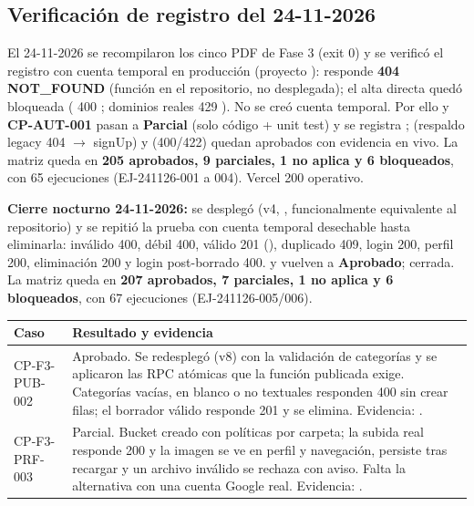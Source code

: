 \documentclass[11pt,a4paper]{article}
\begin{document}
\subsection*{Verificación de registro del 24-11-2026}

El 24-11-2026 se recompilaron los cinco PDF de Fase 3 (exit 0) y se verificó el registro
con cuenta temporal en producción (proyecto ):
 responde \textbf{404 NOT\_FOUND}
(función en el repositorio, no desplegada); el alta directa quedó bloqueada
( 400 ; dominios reales 429
). No se creó cuenta temporal. Por ello
 y \textbf{CP-AUT-001} pasan a \textbf{Parcial} (solo código +
unit test) y se registra ;  (respaldo legacy
404 $\rightarrow$ signUp) y  (400/422) quedan aprobados con evidencia
en vivo. La matriz queda en \textbf{205 aprobados, 9 parciales, 1 no aplica y 6 bloqueados},
con 65 ejecuciones (EJ-241126-001 a 004). Vercel  200 operativo.

\textbf{Cierre nocturno 24-11-2026:} se desplegó  (v4,
, funcionalmente equivalente al repositorio) y se repitió la
prueba con cuenta temporal desechable hasta eliminarla: inválido 400, débil 400,
válido 201 (), duplicado 409, login 200, perfil 200, eliminación
200 y login post-borrado 400.  y  vuelven a
\textbf{Aprobado};  cerrada. La matriz queda en \textbf{207 aprobados,
7 parciales, 1 no aplica y 6 bloqueados}, con 67 ejecuciones (EJ-241126-005/006).

\begin{longtable}{@{}L{2.4cm}L{12.4cm}@{}}
\toprule
\textbf{Caso} & \textbf{Resultado y evidencia} \\
\midrule
\endhead
CP-F3-PUB-002 & Aprobado. Se redesplegó  (v8) con la validación de
categorías y se aplicaron las RPC atómicas que la función publicada exige. Categorías
vacías, en blanco o no textuales responden 400 sin crear filas; el borrador válido responde
201 y se elimina. Evidencia: . \\
CP-F3-PRF-003 & Parcial. Bucket  creado con políticas por carpeta; la subida
real responde 200 y la imagen se ve en perfil y navegación, persiste tras recargar y un
archivo inválido se rechaza con aviso. Falta la alternativa con una cuenta Google real.
Evidencia: . \\
\bottomrule
\end{longtable}
\end{document}
